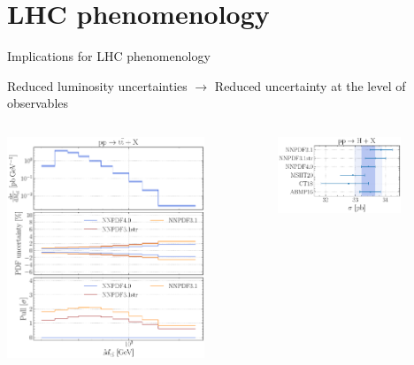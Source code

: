 \documentclass[aspectratio=169,9pt]{beamer}
\begin{document}
\section{LHC phenomenology}
\begin{frame}[t]{Implications for LHC phenomenology}
    \begin{center}
        Reduced luminosity uncertainties $\rightarrow$ Reduced uncertainty at the level of observables\\
        \vspace*{-0.5em}
        \begin{columns}
          \begin{column}{0.48\textwidth}
              \begin{center}
                  \includegraphics[width=0.78\textwidth]{NNPDF_TTB_14TEV_40_PHENO-internal} 
              \end{center}
          \end{column}
          \begin{column}{0.48\textwidth}
              \includegraphics[width=0.7\textwidth]{NNPDF_H_14TEV_40_PHENO-integrated}\\

\end{column}
\end{columns}
\end{center}
\end{frame}
\end{document}
